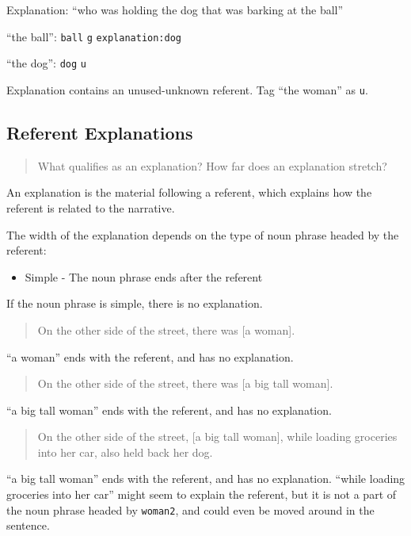 \documentclass[
]{book}
\providecommand{\tightlist}{%
  \setlength{\itemsep}{0pt}\setlength{\parskip}{0pt}}
\begin{document}
Explanation: ``who was holding the dog that was barking at the ball''

``the ball'': \texttt{ball} \texttt{g} \texttt{explanation:dog}

``the dog'': \texttt{dog} \texttt{u}

Explanation contains an unused-unknown referent.
Tag ``the woman'' as \texttt{u}.

\hypertarget{referent-explanations}{%
\subsection{Referent Explanations}\label{referent-explanations}}

\begin{quote}
What qualifies as an explanation?
How far does an explanation stretch?
\end{quote}

An explanation is the material following a referent,
which explains how the referent is related to the narrative.

The width of the explanation depends on the type of noun phrase headed by the referent:

\begin{itemize}
\tightlist
\item
  Simple - The noun phrase ends after the referent
\end{itemize}

If the noun phrase is simple, there is no explanation.

\begin{quote}
On the other side of the street,
there was {[}a woman{]}.
\end{quote}

``a woman'' ends with the referent, and has no explanation.

\begin{quote}
On the other side of the street,
there was {[}a big tall woman{]}.
\end{quote}

``a big tall woman'' ends with the referent, and has no explanation.

\begin{quote}
On the other side of the street,
{[}a big tall woman{]}, while loading groceries into her car,
also held back her dog.
\end{quote}

``a big tall woman'' ends with the referent, and has no explanation.
``while loading groceries into her car'' might seem to explain the referent,
but it is not a part of the noun phrase headed by \texttt{woman2},
and could even be moved around in the sentence.
\end{document}

